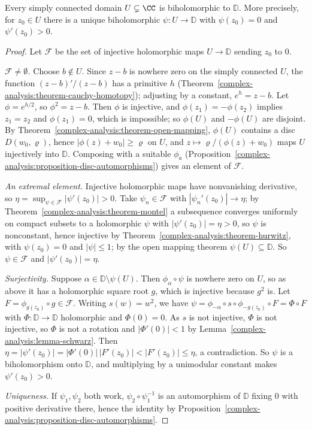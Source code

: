 \begin{theorem}\label{complex-analysis:theorem-riemann-mapping}
Every simply connected domain $U \subsetneq \CC$ is biholomorphic to $\mathbb{D}$. More precisely, for $z_0 \in U$ there is a unique biholomorphic $\psi \colon U \to \mathbb{D}$ with $\psi(z_0) = 0$ and
$\psi'(z_0) > 0$.
\end{theorem}

\begin{proof}
Let $\mathcal{F}$ be the set of injective holomorphic maps $U \to \mathbb{D}$ sending $z_0$ to $0$.

\emph{$\mathcal{F} \neq \emptyset$.} Choose $b \notin U$. Since $z - b$ is nowhere zero on the simply connected $U$, the function $(z - b)'/(z - b)$ has a primitive $h$
(Theorem~\ref{complex-analysis:theorem-cauchy-homotopy}); adjusting by a constant, $e^{h} = z - b$. Let $\phi = e^{h/2}$, so $\phi^2 = z - b$. Then $\phi$ is injective, and $\phi(z_1) = -\phi(z_2)$ implies
$z_1 = z_2$ and $\phi(z_1) = 0$, which is impossible; so $\phi(U)$ and $-\phi(U)$ are disjoint. By Theorem~\ref{complex-analysis:theorem-open-mapping}, $\phi(U)$ contains a disc $D(w_0, \varrho)$, hence
$|\phi(z) + w_0| \geq \varrho$ on $U$, and $z \mapsto \varrho/(\phi(z) + w_0)$ maps $U$ injectively into $\mathbb{D}$. Composing with a suitable $\phi_a$
(Proposition~\ref{complex-analysis:proposition-disc-automorphisms}) gives an element of $\mathcal{F}$.

\emph{An extremal element.} Injective holomorphic maps have nonvanishing derivative, so $\eta = \sup_{\psi \in \mathcal{F}}|\psi'(z_0)| > 0$. Take $\psi_n \in \mathcal{F}$ with $|\psi_n'(z_0)| \to \eta$; by
Theorem~\ref{complex-analysis:theorem-montel} a subsequence converges uniformly on compact subsets to a holomorphic $\psi$ with $|\psi'(z_0)| = \eta > 0$, so $\psi$ is nonconstant, hence injective by
Theorem~\ref{complex-analysis:theorem-hurwitz}, with $\psi(z_0) = 0$ and $|\psi| \leq 1$; by the open mapping theorem $\psi(U) \subseteq \mathbb{D}$. So $\psi \in \mathcal{F}$ and $|\psi'(z_0)| = \eta$.

\emph{Surjectivity.} Suppose $\alpha \in \mathbb{D} \setminus \psi(U)$. Then $\phi_\alpha \circ \psi$ is nowhere zero on $U$, so as above it has a holomorphic square root $g$, which is injective because
$g^2$ is. Let $F = \phi_{g(z_0)} \circ g \in \mathcal{F}$. Writing $s(w) = w^2$, we have $\psi = \phi_{-\alpha} \circ s \circ \phi_{-g(z_0)} \circ F = \Phi \circ F$ with $\Phi \colon \mathbb{D} \to \mathbb{D}$
holomorphic and $\Phi(0) = 0$. As $s$ is not injective, $\Phi$ is not injective, so $\Phi$ is not a rotation and $|\Phi'(0)| < 1$ by Lemma~\ref{complex-analysis:lemma-schwarz}. Then
$\eta = |\psi'(z_0)| = |\Phi'(0)|\,|F'(z_0)| < |F'(z_0)| \leq \eta$, a contradiction. So $\psi$ is a biholomorphism onto $\mathbb{D}$, and multiplying by a unimodular constant makes $\psi'(z_0) > 0$.

\emph{Uniqueness.} If $\psi_1, \psi_2$ both work, $\psi_2 \circ \psi_1^{-1}$ is an automorphism of $\mathbb{D}$ fixing $0$ with positive derivative there, hence the identity by
Proposition~\ref{complex-analysis:proposition-disc-automorphisms}.
\end{proof}

